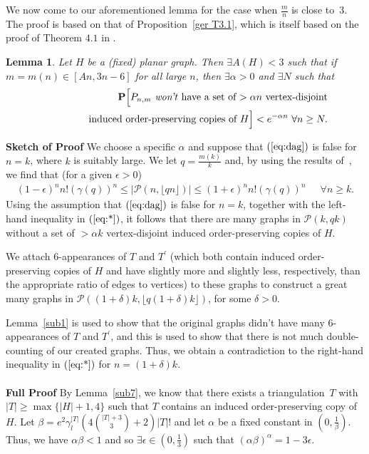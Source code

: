 \documentclass{article}
\newtheorem{Lemma}[Theorem]{Lemma}
\newtheorem{Proof of Theorem}{Proof of Theorem}
\begin{document}
We now come to our aforementioned lemma for the case when $\frac{m}{n}$ is close to~$3$.
The proof is based on that of Proposition~\ref{ger T3.1},
which is itself based on the proof of Theorem $4.1$ in \cite{mcd}.















\begin{Lemma} \label{sub2}
Let $H$ be a (fixed) planar graph.
Then $\exists A(H) < 3$ such that if
$m=m(n) \in [An,3n-6]$ for all large $n$,
then $\exists  \alpha >0$ and $\exists N$ such that
\begin{eqnarray}
& & \mathbf{P}\Big[\textrm{$P_{n,m}$
\emph{won't} have a set of $> \alpha n$ vertex-disjoint} \nonumber \\
& & \phantom{wwwww}\textrm{induced order-preserving copies of $H$}\Big]  
< e^{- \alpha n} 
\textrm{ } \forall n \geq N. \label{eq:dag}
\end{eqnarray}
\end{Lemma}
\textbf{Sketch of Proof} 
We choose a specific $\alpha$ and suppose that $(\ref{eq:dag})$ is false for~$n=k$,
where $k$ is suitably large.
We let $q= \frac{m(k)}{k}$
and, by using the results of~\cite{ger},
we find that (for a given $\epsilon > 0$)
\begin{eqnarray}
(1-\epsilon)^{n}n!(\gamma (q))^{n} \leq |\mathcal{P}(n, \lfloor qn \rfloor)| \leq 
(1+ \epsilon)^{n}n!(\gamma (q))^{n} \phantom{ww}\forall n \geq k.
\label{eq:*} 
\end{eqnarray}
Using the assumption that $(\ref{eq:dag})$ is false for $n=k$,
together with the left-hand inequality in $(\ref{eq:*})$,
it follows that there are many graphs in $\mathcal{P}(k,qk)$
without a set of $> \alpha k$ vertex-disjoint induced order-preserving copies of $H$.

We attach $6$-appearances of $T$ and $T^{\prime}$
(which both contain induced order-preserving copies of $H$ and have slightly more and slightly less, respectively,
than the appropriate ratio of edges to vertices)
to these graphs to construct a great many graphs in $\mathcal{P}((1+\delta)k, \lfloor q(1+ \delta)k \rfloor)$,
for some $\delta > 0$.

Lemma~\ref{sub1} is used to show that the original graphs didn't have many 
$6$-appearances of $T$ and $T^{\prime}$,
and this is used to show that there is not much double-counting of our created graphs.
Thus, we obtain a contradiction to the right-hand inequality in $(\ref{eq:*})$ for $n=(1+\delta)k$. \\
\\
\textbf{Full Proof}
By Lemma~\ref{sub7},
we know that there exists a triangulation~$T$ with $|T| \geq \max \{ |H|+1, 4 \}$
such that $T$ contains an induced order-preserving copy of~$H$. 
Let $\beta = e^{2} \gamma_{l}^{|T|} \left( 4 \left(^{|T|+3}_{\phantom{qw}3} \right) +2 \right) |T|!$
and let $\alpha$ be a fixed constant in $\left( 0, \frac{1}{\beta} \right)$.
Thus, we have $\alpha \beta <1$
and so $\exists \epsilon \in \left( 0, \frac{1}{3} \right)$
such that $(\alpha \beta)^{\alpha} = 1 - 3 \epsilon$.
\end{document}
